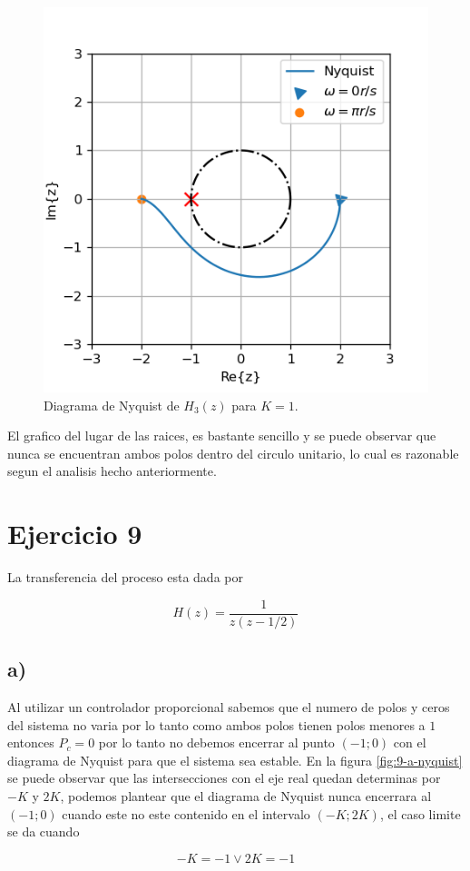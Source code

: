 \documentclass{article}
\begin{document}
        \begin{figure}[!htb]
            \centering
            \includegraphics[width=.4\textwidth]{Img/8-c-nyquist}
            \caption{Diagrama de Nyquist de $H_3(z)$ para $K=1$.}
            \label{fig:8-c-nyquist}
        \end{figure}

        El grafico del lugar de las raices, es bastante sencillo y se puede observar que nunca se encuentran ambos polos dentro del circulo 
        unitario, lo cual es razonable segun el analisis hecho anteriormente.

    \section{Ejercicio 9}

        La transferencia del proceso esta dada por 

        \begin{equation}
            H(z) = \frac{1}{z(z - 1/2)}
        \end{equation}

        \subsection{a)}

        Al utilizar un controlador proporcional sabemos que el numero de polos y ceros del sistema no varia por lo tanto 
        como ambos polos tienen polos menores a $1$ entonces $P_c=0$ por lo tanto no debemos encerrar al punto $(-1;0)$ con el diagrama de Nyquist para que el sistema 
        sea estable. En la figura \ref{fig:9-a-nyquist} se puede observar que las intersecciones con el eje real quedan determinas por $-K$ y $2K$, 
        podemos plantear que el diagrama de Nyquist nunca encerrara al $(-1;0)$ cuando este no este contenido en el intervalo $(-K;2K)$, el caso limite se 
        da cuando 

        \begin{equation}
            -K=-1 \lor 2K=-1
        \end{equation}
\end{document}
